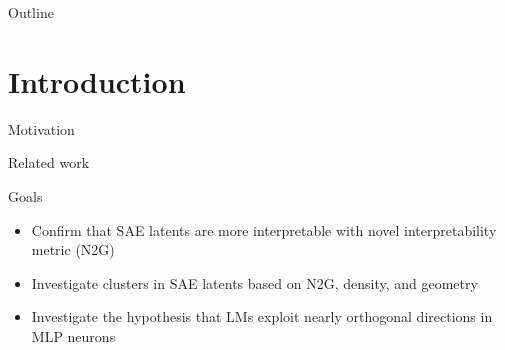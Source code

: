 \documentclass[aspectratio=169,hyperref={pdfpagelabels=false}]{beamer}
\subtitle{\thesissubtitle}
\title{\thesistitle}
\begin{document}
\inserttitlepage


\begin{frame}{Outline} %
	\tableofcontents

\end{frame}
\note{

}


\section{Introduction} %
\begin{frame}{Motivation} %
\end{frame}

\begin{frame}{Related work} %
\end{frame}
\note{
    
}

\begin{frame}{Goals} %
    \begin{itemize}
        \item Confirm that SAE latents are more interpretable with novel interpretability metric (N2G)
        \item Investigate clusters in SAE latents based on N2G, density, and geometry
        \item Investigate the hypothesis that LMs exploit nearly orthogonal directions in MLP neurons
    \end{itemize}
\end{frame}
\end{document}
